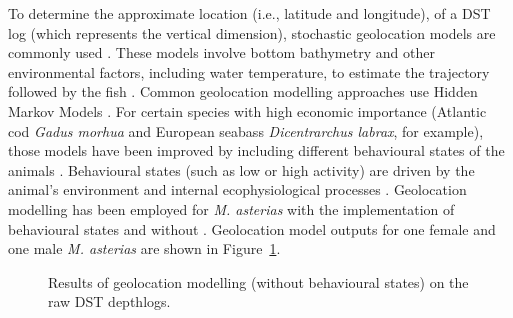 \documentclass[
  authoryear,
  review,
  3p]{elsarticle}
\begin{document}
To determine the approximate location (i.e., latitude and longitude), of
a DST log (which represents the vertical dimension), stochastic
geolocation models are commonly used \citep{gatti_2021}. These models
involve bottom bathymetry and other environmental factors, including
water temperature, to estimate the trajectory followed by the fish
\citep{nielsen_2004}. Common geolocation modelling approaches use Hidden
Markov Models \citep[HMM,][]{pedersen_2008, woillez_2016}. For certain
species with high economic importance (Atlantic cod \emph{Gadus morhua}
and European seabass \emph{Dicentrarchus labrax}, for example), those
models have been improved by including different behavioural states of
the animals \citep{pedersen_2008, heerah_2017}. Behavioural states (such
as low or high activity) are driven by the animal's environment and
internal ecophysiological processes \citep{gurarie_2016}. Geolocation
modelling has been employed for \emph{M. asterias} with the
implementation of behavioural states \citep[following the approach
by][]{pedersen_2008} and without \citep{goossens_2023}. Geolocation
model outputs for one female and one male \emph{M. asterias} are shown
in Figure~\ref{fig-mapgeolocation}.

\begin{figure}

\begin{minipage}[t]{\linewidth}

{\centering 


}

\end{minipage}%
\newline
\begin{minipage}[t]{\linewidth}

{\centering 


}

\end{minipage}%

\caption{\label{fig-mapgeolocation}Results of geolocation modelling
(without behavioural states) on the raw DST depthlogs.}

\end{figure}
\end{document}
